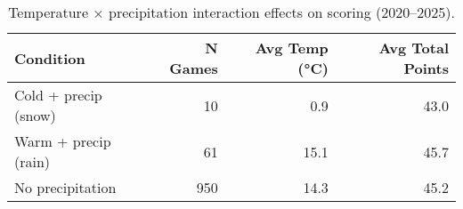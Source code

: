 \begin{table}[t]
  \centering
  \small
  \caption[Precipitation interaction effects]{Temperature × precipitation interaction effects on scoring (2020--2025).}
  \label{tab:precip-interaction}
  \setlength{\tabcolsep}{4pt}\renewcommand{\arraystretch}{1.12}
  \begin{tabular}{@{} l r r r @{} }
    \toprule
    \textbf{Condition} & \textbf{N Games} & \textbf{Avg Temp (°C)} & \textbf{Avg Total Points} \\
    \midrule
    Cold + precip (snow) & 10 & 0.9 & 43.0 \\
    Warm + precip (rain) & 61 & 15.1 & 45.7 \\
    No precipitation & 950 & 14.3 & 45.2 \\
    \bottomrule
  \end{tabular}
\end{table}
